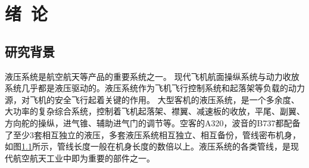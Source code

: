 


\chapter{绪~论}
\label{chap:introduintroduction}
\section{研究背景}



液压系统是航空航天等产品的重要系统之一。
现代飞机航面操纵系统与动力收放系统几乎都是液压驱动的。液压系统作为飞机飞行控制系统和起落架等负载的动力源，对飞机的安全飞行起着关键的作用。
大型客机的液压系统，是一个多余度、大功率的复杂综合系统，控制着飞机起落架、襟翼、减速板的收放，平尾、副翼、方向舵的操纵，进气锥、辅助进气门的调节等\cite{dingfei2010}。空客的A320，波音的B737都配备了至少3套相互独立的液压\cite{dingfei2010}，多套液压系统相互独立、相互备份，管线密布机身，如图\ref{fig:plane-hose}所示，管线长度一般在机身长度的数倍以上。液压系统的各类管线，是现代航空航天工业中即为重要的部件之一。

\begin{figure}[!htbp]
	\centering
	\hspace{1cm}
	\label{fig:plane-hose}
\end{figure}




